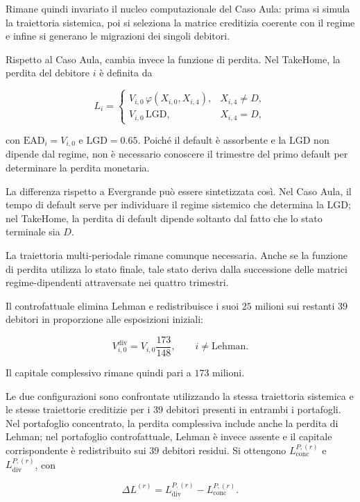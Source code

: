 Rimane quindi invariato il nucleo computazionale del Caso Aula: prima si
simula la traiettoria sistemica, poi si seleziona la matrice creditizia
coerente con il regime e infine si generano le migrazioni dei singoli
debitori.

Rispetto al Caso Aula, cambia invece la funzione di perdita. Nel TakeHome,
la perdita del debitore $i$ \`{e} definita da

\[
L_i
=
\begin{cases}
V_{i,0}\,
\varphi(X_{i,0},X_{i,4}),
&
X_{i,4}\neq D,
\\[2mm]
V_{i,0}\,\mathrm{LGD},
&
X_{i,4}=D,
\end{cases}
\]

\noindent con $\mathrm{EAD}_i=V_{i,0}$ e $\mathrm{LGD}=0.65$.
Poich\'e il default \`e assorbente e la $\mathrm{LGD}$ non dipende dal regime, non \`e
necessario conoscere il trimestre del primo default per determinare la
perdita monetaria.

La differenza rispetto a Evergrande pu\`o essere sintetizzata cos\`i. Nel
Caso Aula, il tempo di default serve per individuare il regime sistemico che
determina la $\mathrm{LGD}$; nel TakeHome, la perdita di default dipende soltanto dal
fatto che lo stato terminale sia $D$.

La traiettoria multi-periodale rimane comunque necessaria. Anche se la
funzione di perdita utilizza lo stato finale, tale stato deriva dalla
successione delle matrici regime-dipendenti attraversate nei quattro
trimestri.

Il controfattuale elimina Lehman e redistribuisce i suoi $25$ milioni sui
restanti $39$ debitori in proporzione alle esposizioni iniziali:

\[
V_{i,0}^{\mathrm{div}}
=
V_{i,0}\frac{173}{148},
\qquad
i\neq\mathrm{Lehman}.
\]

Il capitale complessivo rimane quindi pari a $173$ milioni.

Le due configurazioni sono confrontate utilizzando la stessa traiettoria
sistemica e le stesse traiettorie creditizie per i $39$ debitori presenti
in entrambi i portafogli. Nel portafoglio concentrato, la perdita complessiva
include anche la perdita di Lehman; nel portafoglio controfattuale, Lehman
\`e invece assente e il capitale corrispondente \`e redistribuito sui
$39$ debitori residui. Si ottengono
$L_{\mathrm{conc}}^{P,(r)}$ e
$L_{\mathrm{div}}^{P,(r)}$, con

\[
\Delta L^{(r)}
=
L_{\mathrm{div}}^{P,(r)}
-
L_{\mathrm{conc}}^{P,(r)}.
\]

